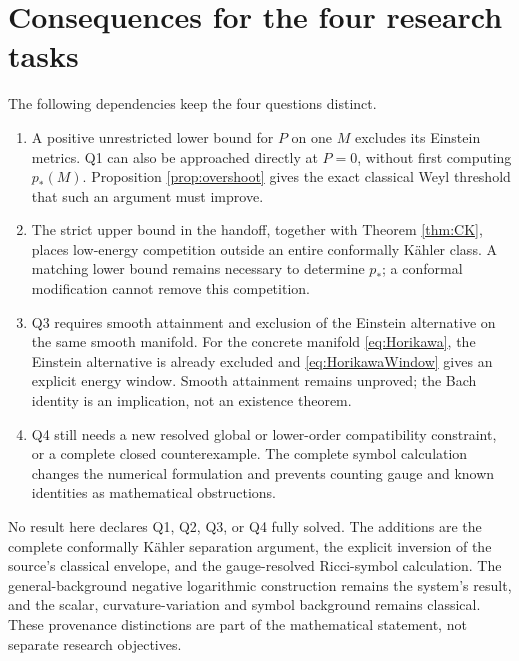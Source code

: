 \documentclass[11pt,a4paper]{article}
\numberwithin{equation}{section}
\theoremstyle{definition}\newtheorem{hypothesis}[theorem]{Input}
\theoremstyle{remark}\newtheorem{remark}[theorem]{Remark}
\begin{document}
\section{Consequences for the four research tasks}

The following dependencies keep the four questions distinct.
\begin{enumerate}
\item A positive unrestricted lower bound for $P$ on one $M$ excludes its
Einstein metrics.  Q1 can also be approached directly at $P=0$, without
first computing $p_*(M)$.  Proposition \ref{prop:overshoot} gives the exact
classical Weyl threshold that such an argument must improve.
\item The strict upper bound in the handoff, together with Theorem
\ref{thm:CK}, places low-energy competition outside an entire conformally
K\"ahler class.  A matching lower bound remains necessary to determine
$p_*$; a conformal modification cannot remove this competition.
\item Q3 requires smooth attainment and exclusion of the Einstein
alternative on the same smooth manifold.  For the concrete manifold
\eqref{eq:Horikawa}, the Einstein alternative is already excluded and
\eqref{eq:HorikawaWindow} gives an explicit energy window.  Smooth attainment
remains unproved; the Bach identity is an implication, not an existence theorem.
\item Q4 still needs a new resolved global or lower-order compatibility
constraint, or a complete closed counterexample.  The complete symbol
calculation changes the numerical formulation and prevents counting gauge
and known identities as mathematical obstructions.
\end{enumerate}

No result here declares Q1, Q2, Q3, or Q4 fully solved.  The additions are the
complete conformally K\"ahler separation argument, the explicit inversion of
the source's classical envelope, and the gauge-resolved Ricci-symbol
calculation.  The general-background negative logarithmic construction
remains the system's result, and the scalar, curvature-variation and symbol
background remains classical.  These provenance distinctions are part of
the mathematical statement, not separate research objectives.
\end{document}
